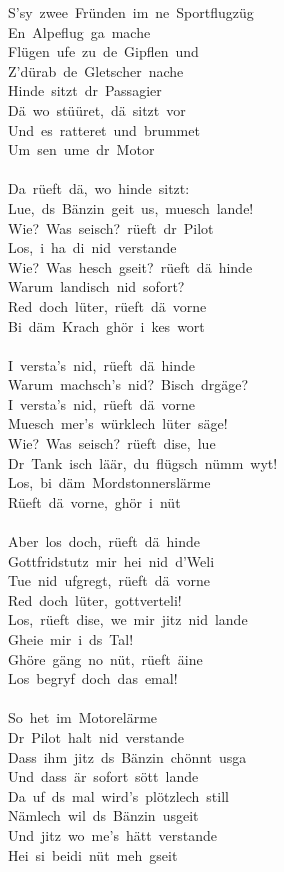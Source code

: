 \documentclass[]{book}
\begin{document}
S'sy~zwee~Fründen~im~ne~Sportflugzüg\\
En~Alpeflug~ga~mache\\
Flügen~ufe~zu~de~Gipflen~und\\
Z'dürab~de~Gletscher~nache\\
Hinde~sitzt~dr~Passagier\\
Dä~wo~stüüret,~dä~sitzt~vor\\
Und~es~ratteret~und~brummet\\
Um~sen~ume~dr~Motor\\
~\\
Da~rüeft~dä,~wo~hinde~sitzt:\\
Lue,~ds~Bänzin~geit~us,~muesch~lande!\\
Wie?~Was~seisch?~rüeft~dr~Pilot\\
Los,~i~ha~di~nid~verstande\\
Wie?~Was~hesch~gseit?~rüeft~dä~hinde\\
Warum~landisch~nid~sofort?\\
Red~doch~lüter,~rüeft~dä~vorne\\
Bi~däm~Krach~ghör~i~kes~wort\\
~\\
I~versta's~nid,~rüeft~dä~hinde\\
Warum~machsch's~nid?~Bisch~drgäge?\\
I~versta's~nid,~rüeft~dä~vorne\\
Muesch~mer's~würklech~lüter~säge!\\
Wie?~Was~seisch?~rüeft~dise,~lue\\
Dr~Tank~isch~läär,~du~flügsch~nümm~wyt!\\
Los,~bi~däm~Mordstonnerslärme\\
Rüeft~dä~vorne,~ghör~i~nüt\\
~\\
Aber~los~doch,~rüeft~dä~hinde\\
Gottfridstutz~mir~hei~nid~d'Weli\\
Tue~nid~ufgregt,~rüeft~dä~vorne\\
Red~doch~lüter,~gottverteli!\\
Los,~rüeft~dise,~we~mir~jitz~nid~lande\\
Gheie~mir~i~ds~Tal!\\
Ghöre~gäng~no~nüt,~rüeft~äine\\
Los~begryf~doch~das~emal!\\
~\\
So~het~im~Motorelärme\\
Dr~Pilot~halt~nid~verstande\\
Dass~ihm~jitz~ds~Bänzin~chönnt~usga\\
Und~dass~är~sofort~sött~lande\\
Da~uf~ds~mal~wird's~plötzlech~still\\
Nämlech~wil~ds~Bänzin~usgeit\\
Und~jitz~wo~me's~hätt~verstande\\
Hei~si~beidi~nüt~meh~gseit~\\
~\\
~\\
\end{document}
